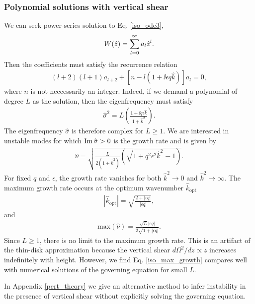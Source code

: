 \subsubsection{Polynomial solutions with vertical shear}\label{iso_poly}
We can seek power-series solution to Eq. \ref{iso_ode3},
\begin{align}
  W(\hat{z}) = \sum_{l=0}^\infty a_l\hat{z}^l. 
\end{align}
Then the coefficients must satisfy the recurrence relation
\begin{align}
  (l+2)(l+1)a_{l+2} +
  \left[n - l\left(1+\ii \epsilon q  \hat{k}\right)\right] a_l = 0, 
\end{align}
where $n$ is not neccessarily an integer. Indeed, if we demand
a polynomial of degree $L$ as the solution, then the eigenfrequency
must satisfy
\begin{align}\label{sig2_iso}
\hat{\sigma}^2 = L\left(\frac{1+\ii q \epsilon
    \hat{k}}{1+\hat{k}^2}\right).
\end{align}
The eigenfrequency $\hat{\sigma}$ is therefore complex for
$L\geq1$. We are interested in 
unstable modes for which $\operatorname{Im}{\hat{\sigma}}>0$ is the growth rate and is
given by 
\begin{align}\label{simple_growth}
  \hat{\nu} =\sqrt{
   \frac{L}{2\left(1+\hat{k}^2\right)}\left(\sqrt{1+q^2\epsilon^2\hat{k}^2} - 
    1\right)}. 
\end{align}
For fixed $q$ and $\epsilon$, the growth rate vanishes for both
$\hat{k}^2\to0$ and $\hat{k}^2\to\infty$. The maximum growth rate
occurs at the optimum wavenumber $\hat{k}_\mathrm{opt}$
\begin{align}
  |\hat{k}_\mathrm{opt}| = \sqrt{\frac{2+|\epsilon q|}{|\epsilon q|}},
\end{align}
and
\begin{align}
  \mathrm{max}\left(\hat{\nu}\right) =\frac{\sqrt{L}|\epsilon
    q|}{2\sqrt{1+|\epsilon q|}}. \label{iso_max_growth}
\end{align}
Since $L\geq1$, there is no limit to the maximum growth rate. This is
an artifact of the thin-disk approximation because the vertical 
shear $d\Omega^2/dz\propto z$ increases indefinitely with
height. However, we find Eq. \ref{iso_max_growth} compares well with
numerical solutions of the governing equation for small $L$.      


In Appendix \ref{pert_theory} we give an alternative method to
infer instability in the presence of vertical shear without explicitly
solving the governing equation. 

